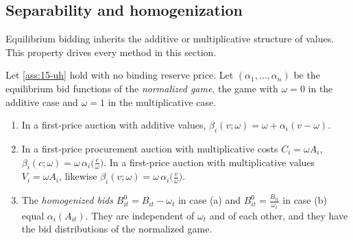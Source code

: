 \subsection{Separability and homogenization}\label{sec:15-uh-sep}

Equilibrium bidding inherits the additive or multiplicative structure of values. This property drives
every method in this section.

\begin{lemma}\label{lem:15-separability}
Let \cref{ass:15-uh} hold with no binding reserve price. Let $(\alpha_1,\dots,\alpha_n)$ be the
equilibrium bid functions of the \emph{normalized game}, the game with $\omega=0$ in the additive case
and $\omega=1$ in the multiplicative case.
\begin{enumerate}[label=(\alph*)]
\item In a first-price auction with additive values, $\beta_i(v;\omega)=\omega+\alpha_i(v-\omega)$.
\item In a first-price procurement auction with multiplicative costs $C_i=\omega A_i$,
$\beta_i(c;\omega)=\omega\,\alpha_i\big(\frac{c}{\omega}\big)$. In a first-price auction with
multiplicative values $V_i=\omega A_i$, likewise $\beta_i(v;\omega)=\omega\,\alpha_i\big(\frac{v}{\omega}\big)$.
\item The \emph{homogenized bids} $B^0_{it}=B_{it}-\omega_t$ in case (a) and $B^0_{it}=\frac{B_{it}}{\omega_t}$
in case (b) equal $\alpha_i(A_{it})$. They are independent of $\omega_t$ and of each other, and they
have the bid distributions of the normalized game.
\end{enumerate}
\end{lemma}

